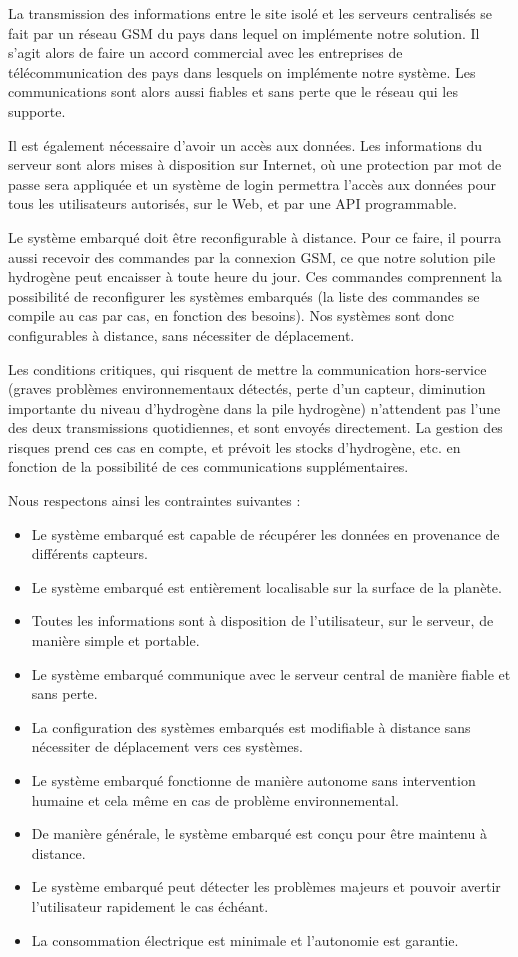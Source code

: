 La transmission des informations entre le site isolé et les serveurs centralisés se fait par un réseau GSM du pays dans lequel on implémente notre solution. Il s’agit alors de faire un accord commercial avec les entreprises de télécommunication des pays dans lesquels on implémente notre système. Les communications sont alors aussi fiables et sans perte que le réseau qui les supporte.

Il est également nécessaire d’avoir un accès aux données. Les informations du serveur sont alors mises à disposition sur Internet, où une protection par mot de passe sera appliquée et un système de login permettra l’accès aux données pour tous les utilisateurs autorisés, sur le Web, et par une API programmable.

Le système embarqué doit être reconfigurable à distance. Pour ce faire, il pourra aussi recevoir des commandes par la connexion GSM, ce que notre solution pile hydrogène peut encaisser à toute heure du jour. Ces commandes comprennent la possibilité de reconfigurer les systèmes embarqués (la liste des commandes se compile au cas par cas, en fonction des besoins). Nos systèmes sont donc configurables à distance, sans nécessiter de déplacement.

Les conditions critiques, qui risquent de mettre la communication hors-service (graves problèmes environnementaux détectés, perte d’un capteur, diminution importante du niveau d’hydrogène dans la pile hydrogène) n’attendent pas l’une des deux transmissions quotidiennes, et sont envoyés directement. La gestion des risques prend ces cas en compte, et prévoit les stocks d’hydrogène, etc. en fonction de la possibilité de ces communications supplémentaires.

Nous respectons ainsi les contraintes suivantes :

\begin{itemize}
\item Le système embarqué est capable de récupérer les données en provenance de différents capteurs.
\item Le système embarqué est entièrement localisable sur la surface de la planète.
\item Toutes les informations sont à disposition de l’utilisateur, sur le serveur, de manière simple et portable.
\item Le système embarqué communique avec le serveur central de manière fiable et sans perte.
\item La configuration des systèmes embarqués est modifiable à distance sans nécessiter de déplacement vers ces systèmes.
\item Le système embarqué fonctionne de manière autonome sans intervention humaine et cela même en cas de problème environnemental.
\item De manière générale, le système embarqué est conçu pour être maintenu à distance.
\item Le système embarqué peut détecter les problèmes majeurs et pouvoir avertir l’utilisateur rapidement le cas échéant.
\item La consommation électrique est minimale et l’autonomie est garantie.
\end{itemize}

